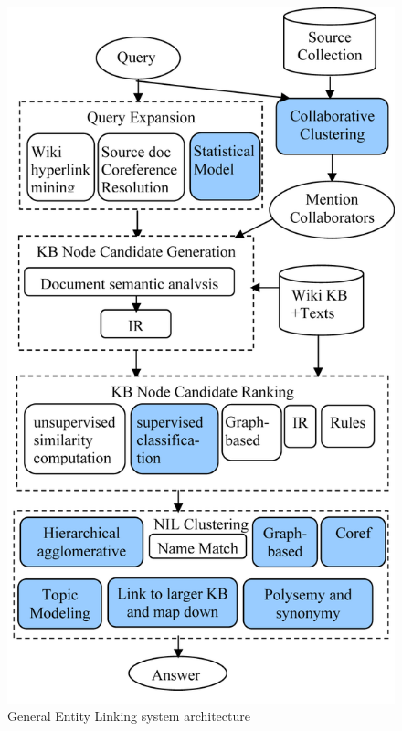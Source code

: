 \documentclass[a4paper,11pt]{report}
\begin{document}
\begin{figure}[htbp] 
\centering
\includegraphics[]{el_architecture}
\caption{General Entity Linking system architecture}
\label{fig:el_arch}
\end{figure}
\end{document}
